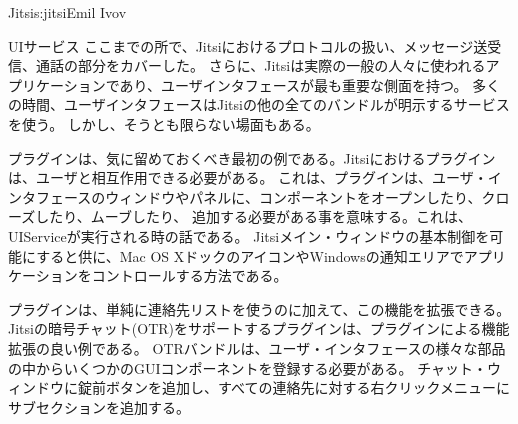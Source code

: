 \begin{aosachapter}{Jitsi}{s:jitsi}{Emil Ivov}
\begin{aosasect1}{UIサービス}
ここまでの所で、Jitsiにおけるプロトコルの扱い、メッセージ送受信、通話の部分をカバーした。
さらに、Jitsiは実際の一般の人々に使われるアプリケーションであり、ユーザインタフェースが最も重要な側面を持つ。
多くの時間、ユーザインタフェースはJitsiの他の全てのバンドルが明示するサービスを使う。
しかし、そうとも限らない場面もある。

プラグインは、気に留めておくべき最初の例である。Jitsiにおけるプラグインは、ユーザと相互作用できる必要がある。
これは、プラグインは、ユーザ・インタフェースのウィンドウやパネルに、コンポーネントをオープンしたり、クローズしたり、ムーブしたり、
追加する必要がある事を意味する。これは、UIServiceが実行される時の話である。
Jitsiメイン・ウィンドウの基本制御を可能にすると供に、Mac OS XドックのアイコンやWindowsの通知エリアでアプリケーションをコントロールする方法である。

プラグインは、単純に連絡先リストを使うのに加えて、この機能を拡張できる。
Jitsiの暗号チャット(OTR)をサポートするプラグインは、プラグインによる機能拡張の良い例である。
OTRバンドルは、ユーザ・インタフェースの様々な部品の中からいくつかのGUIコンポーネントを登録する必要がある。
チャット・ウィンドウに錠前ボタンを追加し、すべての連絡先に対する右クリックメニューにサブセクションを追加する。


\end{aosasect1}
\end{aosachapter}
